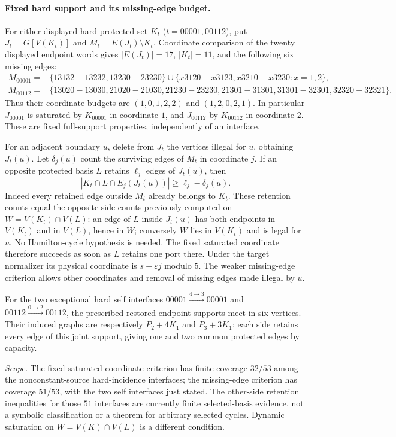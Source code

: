 \paragraph{Fixed hard support and its missing-edge budget.}
For either displayed hard protected set $K_t$ ($t=00001,00112$),
put $J_t=G[V(K_t)]$ and $M_t=E(J_t)\setminus K_t$.
Coordinate comparison of the twenty displayed endpoint words gives
$|E(J_t)|=17$, $|K_t|=11$, and the following six missing edges:
\[
\begin{aligned}
M_{00001}={}&\{13132\!-
13232,13230\!-23230\}\cup
\{x3120\!-x3123,x3210\!-x3230:x=1,2\},\\
M_{00112}={}&\{13020\!-13030,21020\!-21030,21230\!-23230,
21301\!-31301,31301\!-32301,32320\!-32321\}.
\end{aligned}
\]
Thus their coordinate budgets are $(1,0,1,2,2)$ and $(1,2,0,2,1)$.
In particular $J_{00001}$ is saturated by $K_{00001}$ in coordinate
$1$, and $J_{00112}$ by $K_{00112}$ in coordinate $2$.
These are fixed full-support properties, independently of an interface.

For an adjacent boundary $u$, delete from $J_t$ the vertices illegal
for $u$, obtaining $J_t(u)$. Let $\delta_j(u)$ count the surviving
edges of $M_t$ in coordinate $j$. If an opposite protected basis $L$
retains $\ell_j$ edges of $J_t(u)$, then
\[
 |K_t\cap L\cap E_j(J_t(u))|\geq\ell_j-\delta_j(u).
\]
Indeed every retained edge outside $M_t$ already belongs to $K_t$.
These retention counts equal the opposite-side counts previously
computed on $W=V(K_t)\cap V(L)$: an edge of $L$ inside $J_t(u)$
has both endpoints in $V(K_t)$ and in $V(L)$, hence in $W$;
conversely $W$ lies in $V(K_t)$ and is legal for $u$.
No Hamilton-cycle hypothesis is needed. The fixed saturated coordinate
therefore succeeds as soon as $L$ retains one port there. Under the
target normalizer its physical coordinate is $s+\varepsilon j$ modulo $5$.
The weaker missing-edge criterion allows other coordinates and removal
of missing edges made illegal by $u$.

For the two exceptional hard self interfaces
$00001\xrightarrow{4\to3}00001$ and
$00112\xrightarrow{0\to2}00112$, the prescribed restored endpoint
supports meet in six vertices. Their induced graphs are respectively
$P_2+4K_1$ and $P_3+3K_1$; each side retains every edge of this
joint support, giving one and two common protected edges by capacity.

\emph{Scope.} The fixed saturated-coordinate criterion has finite
coverage $32/53$ among the nonconstant-source hard-incidence interfaces;
the missing-edge criterion has coverage $51/53$, with the two self
interfaces just stated. The other-side retention inequalities for those
$51$ interfaces are currently finite selected-basis evidence, not a
symbolic classification or a theorem for arbitrary selected cycles.
Dynamic saturation on $W=V(K)\cap V(L)$ is a different condition.
